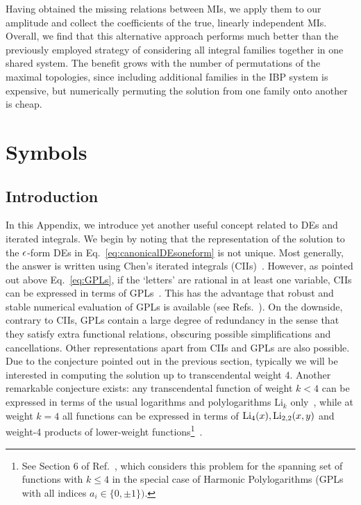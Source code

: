 \documentclass[main.tex]{subfiles}
\begin{document}
Having obtained the missing relations between MIs, we apply them to our amplitude
and collect the coefficients of the true, linearly independent MIs. Overall, we find that this alternative approach performs much better than the previously employed strategy of considering all integral families together in one shared system. The benefit grows with the number of permutations of the maximal topologies, since including additional families in the IBP system is expensive, but numerically permuting the solution from one family onto another is cheap.

\renewcommand{\theequation}{B.\arabic{section}.\arabic{equation}}
\chapter{Symbols} \label{app:symbols}
\section{Introduction}
In this Appendix, we introduce yet another useful concept related to DEs and iterated integrals. We begin by noting that the representation of the solution to the $\epsilon$-form DEs in Eq.~\ref{eq:canonicalDEsoneform} is not unique. Most generally, the answer is written using Chen's iterated integrals (CIIs)~\cite{Chen:1977oja}. 
However, as pointed out above Eq.~\ref{eq:GPLs}, if the `letters' are rational in at least one variable, CIIs can be expressed in terms of GPLs~\cite{Henn:2014qga}. This has the advantage that robust and stable numerical evaluation of GPLs is available (see Refs.~\cite{Bauer:2000cp, Vollinga:2004sn, Panzer:2014caa}). On the downside, contrary to CIIs, GPLs contain a large degree of redundancy in the sense that they satisfy extra functional relations, obscuring possible simplifications and cancellations. Other representations apart from CIIs and GPLs are also possible. Due to the conjecture pointed out in the previous section, typically we will be interested in computing the solution up to transcendental weight 4. Another remarkable conjecture exists: any transcendental function of weight $k < 4$ can be expressed in terms of the usual logarithms and polylogarithms $\text{Li}_k$ only~\cite{MR1265551, Goncharov:2010jf}, while at weight $k=4$ all functions can be expressed in terms of $\text{Li}_4(x), \text{Li}_{2,2}(x,y)$ and weight-4 products of lower-weight functions\footnote{See Section 6 of Ref.~\cite{Duhr:2011zq}, which considers this problem for the spanning set of functions with $k\le4$ in the special case of Harmonic Polylogarithms (GPLs with all indices $a_i\in\{0,\pm1\})$.}~\cite{Henn:2014qga}. 
\end{document}
